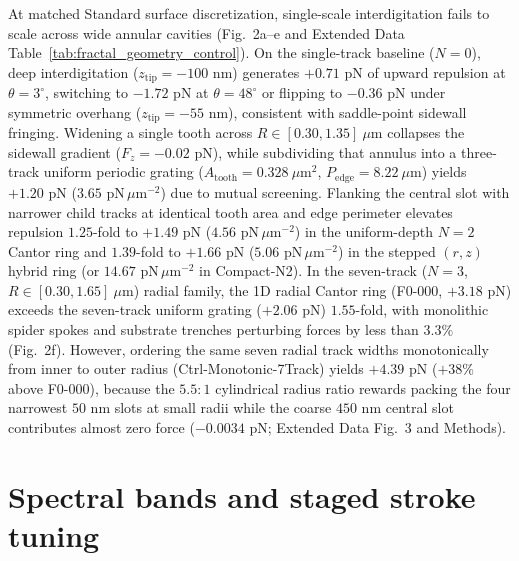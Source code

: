 \documentclass[11pt, a4paper]{article}
\begin{document}
At matched Standard surface discretization, single-scale interdigitation fails to scale across wide annular cavities (Fig.~2a--e and Extended Data Table~\ref{tab:fractal_geometry_control}). On the single-track baseline ($N=0$), deep interdigitation ($z_{\mathrm{tip}} = -100\text{ nm}$) generates $+0.71\text{ pN}$ of upward repulsion at $\theta=3^\circ$, switching to $-1.72\text{ pN}$ at $\theta=48^\circ$ or flipping to $-0.36\text{ pN}$ under symmetric overhang ($z_{\mathrm{tip}} = -55\text{ nm}$), consistent with saddle-point sidewall fringing\cite{levin2010}. Widening a single tooth across $R \in [0.30, 1.35]\ \mu\text{m}$ collapses the sidewall gradient ($F_z = -0.02\text{ pN}$), while subdividing that annulus into a three-track uniform periodic grating ($A_{\mathrm{tooth}} = 0.328\ \mu\text{m}^2$, $P_{\mathrm{edge}} = 8.22\ \mu\text{m}$) yields $+1.20\text{ pN}$ ($3.65\text{ pN}\,\mu\text{m}^{-2}$) due to mutual screening. Flanking the central slot with narrower child tracks at identical tooth area and edge perimeter elevates repulsion $1.25$-fold to $+1.49\text{ pN}$ ($4.56\text{ pN}\,\mu\text{m}^{-2}$) in the uniform-depth $N=2$ Cantor ring and $1.39$-fold to $+1.66\text{ pN}$ ($5.06\text{ pN}\,\mu\text{m}^{-2}$) in the stepped $(r,z)$ hybrid ring (or $14.67\text{ pN}\,\mu\text{m}^{-2}$ in Compact-N2). In the seven-track ($N=3$, $R \in [0.30, 1.65]\ \mu\text{m}$) radial family, the 1D radial Cantor ring (F0-000, $+3.18\text{ pN}$) exceeds the seven-track uniform grating ($+2.06\text{ pN}$) $1.55$-fold, with monolithic spider spokes and substrate trenches perturbing forces by less than $3.3\%$ (Fig.~2f). However, ordering the same seven radial track widths monotonically from inner to outer radius (Ctrl-Monotonic-7Track) yields $+4.39\text{ pN}$ ($+38\%$ above F0-000), because the $5.5:1$ cylindrical radius ratio rewards packing the four narrowest $50\text{ nm}$ slots at small radii while the coarse $450\text{ nm}$ central slot contributes almost zero force ($-0.0034\text{ pN}$; Extended Data Fig.~3 and Methods).

\section*{Spectral bands and staged stroke tuning}
\end{document}
